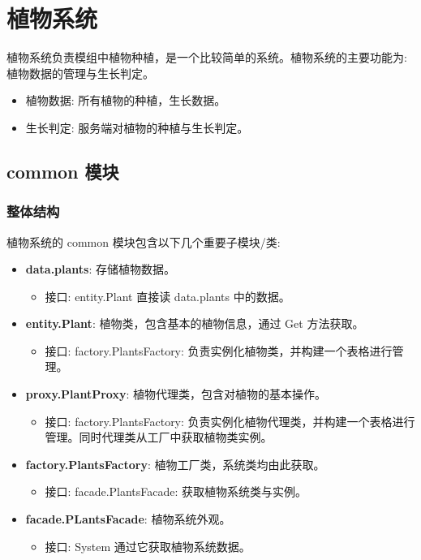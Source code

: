 \section{植物系统}

植物系统负责模组中植物种植，是一个比较简单的系统。植物系统的主要功能为: 植物数据的管理与生长判定。

\begin{itemize}
    \item 植物数据: 所有植物的种植，生长数据。
    \item 生长判定: 服务端对植物的种植与生长判定。
\end{itemize}

\subsection{common 模块}
\subsubsection{整体结构}

植物系统的 common 模块包含以下几个重要子模块/类:
\begin{itemize}
    \item \textbf{data.plants}: 存储植物数据。
    \begin{itemize}
        \item 接口: entity.Plant 直接读 data.plants 中的数据。
    \end{itemize}
    \item \textbf{entity.Plant}: 植物类，包含基本的植物信息，通过 Get 方法获取。
    \begin{itemize}
        \item 接口: factory.PlantsFactory: 负责实例化植物类，并构建一个表格进行管理。
    \end{itemize}
    \item \textbf{proxy.PlantProxy}: 植物代理类，包含对植物的基本操作。
    \begin{itemize}
        \item 接口: factory.PlantsFactory: 负责实例化植物代理类，并构建一个表格进行管理。同时代理类从工厂中获取植物类实例。
    \end{itemize}
    \item \textbf{factory.PlantsFactory}: 植物工厂类，系统类均由此获取。
    \begin{itemize}
        \item 接口: facade.PlantsFacade: 获取植物系统类与实例。
    \end{itemize}
    \item \textbf{facade.PLantsFacade}: 植物系统外观。
    \begin{itemize}
        \item 接口: System 通过它获取植物系统数据。
    \end{itemize}
\end{itemize}
